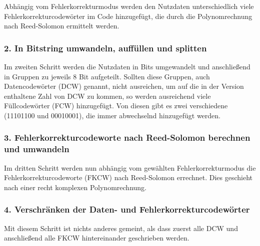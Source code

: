 Abhängig vom Fehlerkorrekturmodus werden den Nutzdaten unterschiedlich viele Fehlerkorrekturcodewörter im Code hinzugefügt, die durch die Polynomrechnung nach Reed-Solomon ermittelt werden.

\subsubsection*{2. In Bitstring umwandeln, auffüllen und splitten}
Im zweiten Schritt werden die Nutzdaten in Bits umgewandelt und anschließend in Gruppen zu jeweils 8 Bit aufgeteilt. Sollten diese Gruppen, auch Datencodewörter (DCW) genannt, nicht ausreichen, um auf die in der Version enthaltene Zahl von DCW zu kommen, so werden ausreichend viele Füllcodewörter (FCW) hinzugefügt. Von diesen gibt es zwei verschiedene (11101100 und 00010001), die immer abwechselnd hinzugefügt werden.

\subsubsection*{3. Fehlerkorrekturcodeworte nach Reed-Solomon berechnen und umwandeln}
Im dritten Schritt werden nun abhängig vom gewählten Fehlerkorrekturmodus die Fehlerkorrekturcodeworte (FKCW) nach Reed-Solomon errechnet. Dies geschieht nach einer recht komplexen Polynomrechnung.

\subsubsection*{4. Verschränken der Daten- und Fehlerkorrekturcodewörter}
Mit diesem Schritt ist nichts anderes gemeint, als dass zuerst alle DCW und anschließend alle FKCW hintereinander geschrieben werden.

